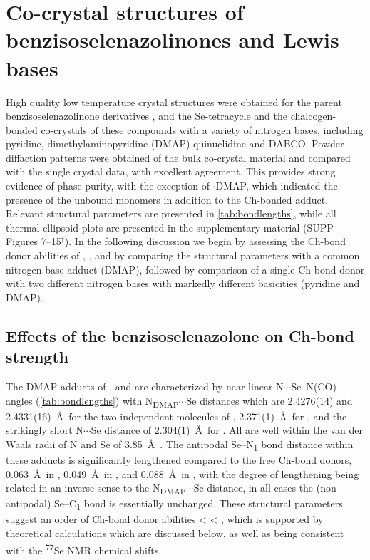 \section{Co-crystal structures of benzisoselenazolinones and Lewis bases}
High quality low temperature crystal structures were obtained for the parent benzisoselenazolinone derivatives  \autocite{Thomas2015},  and the Se-tetracycle  and the chalcogen-bonded co-crystals of these compounds with a variety of nitrogen bases, including pyridine, dimethylaminopyridine (DMAP) quinuclidine and DABCO.
Powder diffaction patterns were obtained of the bulk co-crystal material and compared with the single crystal data, with excellent agreement.
This provides strong evidence of phase purity, with the exception of $\cdot$DMAP, which indicated the presence of the unbound monomers in addition to the Ch-bonded adduct.
Relevant structural parameters are presented in \ref{tab:bondlengths}, while all thermal ellipsoid plots are presented in the supplementary material (SUPP-Figures 7--15$^\dag$).
In the following discussion we begin by assessing the Ch-bond donor abilities of , , and  by comparing the structural parameters with a common nitrogen base adduct (DMAP), followed by comparison of a single Ch-bond donor  with two different nitrogen bases with markedly different basicities (pyridine and DMAP).

\subsection{Effects of the benzisoselenazolone on Ch-bond strength}
The DMAP adducts of ,  and  are characterized by near linear N$\cdots$Se--N(CO) angles (\ref{tab:bondlengths}) with N\textsubscript{DMAP}$\cdots$Se distances which are 2.4276(14) and 2.4331(16)~\AA \ for the two independent molecules of , 2.371(1)~\AA\ for , and the strikingly short N$\cdots$Se distance of 2.304(1)~\AA\ for .
All are well within the van der Waals radii of N and Se of 3.85~\AA\ \autocite{Batsanov2001}.
The antipodal Se--N\textsubscript{1} bond distance within these adducts is significantly lengthened compared to the free Ch-bond donors, 0.063~\AA\ in , 0.049~\AA\ in , and 0.088~\AA\ in , with the degree of lengthening being related in an inverse sense to the N\textsubscript{DMAP}$\cdots$Se distance, in all cases the (non-antipodal) Se--C\textsubscript{1} bond is essentially unchanged.
These structural parameters suggest an order of Ch-bond donor abilities  <  < , which is supported by theoretical calculations which are discussed below, as well as being consistent with the \textsuperscript{77}Se NMR chemical shifts.

